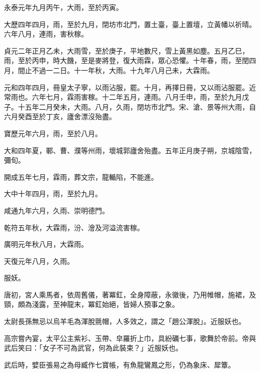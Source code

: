 \begin{pinyinscope}
 永泰元年九月丙午，大雨，至於丙寅。



 大歷四年四月，雨，至於九月，閉坊市北門，置土臺，臺上置壇，立黃幡以祈晴。六年八月，連雨，害秋稼。



 貞元二年正月乙未，大雨雪，至於庚子，平地數尺，雪上黃黑如塵。五月乙巳，雨，至於丙申，時大饑，至是麥將登，復大雨霖，眾心恐懼。十年春，雨，至閏四月，間止不過一二日。十一年秋，大雨。十九年八月己未，大霖雨。



 元和四年四月，冊皇太子寧，以雨沾服，罷。十月，再擇日冊，又以雨沾服罷。近常雨也。六年七月，霖雨害稼。十二年五月，連雨。八月壬申，雨，至於九月戊子。十五年二月癸未，大雨。八月，久雨，閉坊市北門。宋、滄、景等州大雨，自六月癸酉至於丁亥，廬舍漂沒殆盡。



 寶歷元年六月，雨，至於八月。



 大和四年夏，鄆、曹、濮等州雨，壞城郭廬舍殆盡。五年正月庚子朔，京城陰雪，彌旬。



 開成五年七月，霖雨，葬文宗，龍輴陷，不能進。



 大中十年四月，雨，至於九月。



 咸通九年六月，久雨、崇明德門。



 乾符五年秋，大霖雨，汾、澮及河溢流害稼。



 廣明元年秋八月，大霖雨。



 天復元年八月，久雨。



 服妖。



 唐初，宮人乘馬者，依周舊儀，著冪釭，全身障蔽，永徽後，乃用帷帽，施裙，及頸，頗為淺露，至神龍末，冪釭始絕，皆婦人預事之象。



 太尉長孫無忌以烏羊毛為渾脫氈帽，人多效之，謂之「趙公渾脫」。近服妖也。



 高宗嘗內宴，太平公主紫衫、玉帶、皁羅折上巾，具紛礪七事，歌舞於帝前。帝與武后笑曰：「女子不可為武官，何為此裝束？」近服妖也。



 武后時，嬖臣張易之為母臧作七寶帳，有魚龍鸞鳳之形，仍為象床、犀簟。




\end{pinyinscope}
